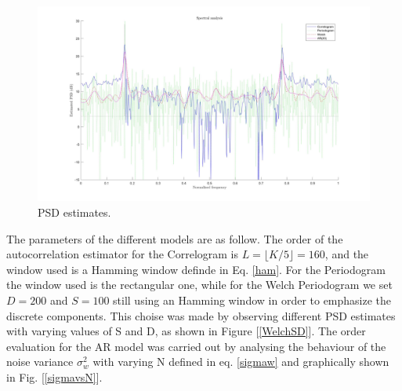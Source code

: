 \documentclass[a4paper,11pt,openright,twoside]{report}
\begin{document}
\begin{figure}
	\centering
	\includegraphics[width=14cm]{images/PSD.jpg}
	\caption{PSD estimates.}\label{PSD} 
\end{figure}

The parameters of the different models are as follow. The order of the autocorrelation estimator for the Correlogram is $ L = \lfloor K/5 \rfloor = 160 $, and the window used is a Hamming window definde in Eq. \ref{ham}. For the Periodogram the window used is the rectangular one, while for the Welch Periodogram we set $D=200$ and $S=100$ still using an Hamming window in order to emphasize the discrete components. This choise was made by observing different PSD estimates with varying values of S and D, as shown in Figure [\ref{WelchSD}]. The order evaluation for the AR model was carried out by analysing the behaviour of the noise variance $\sigma_w^2$ with varying N defined in eq. \ref{sigmaw} and graphically shown in Fig. [\ref{sigmavsN}].
\end{document}
